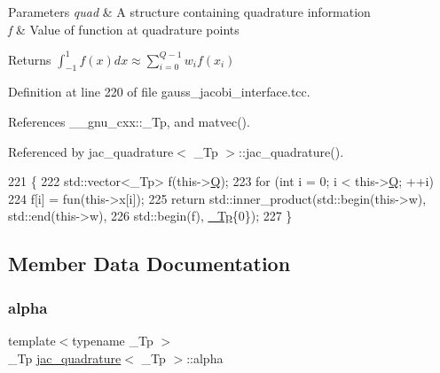 \begin{DoxyParams}{Parameters}
{\em quad} & A structure containing quadrature information \\
\hline
{\em f} & Value of function at quadrature points \\
\hline
\end{DoxyParams}
\begin{DoxyReturn}{Returns}
$\int_{-1}^{1} f(x) dx \approx \sum_{i=0}^{Q-1} w_i f(x_i)$ 
\end{DoxyReturn}


Definition at line 220 of file gauss\+\_\+jacobi\+\_\+interface.\+tcc.



References \+\_\+\+\_\+gnu\+\_\+cxx\+::\+\_\+\+Tp, and matvec().



Referenced by jac\+\_\+quadrature$<$ \+\_\+\+Tp $>$\+::jac\+\_\+quadrature().


\begin{DoxyCode}
221     \{
222       std::vector<\_Tp> f(this->\hyperlink{structjac__quadrature_a91ae5ef05b9ea80951e40cc8a794c834}{Q});
223       \textcolor{keywordflow}{for} (\textcolor{keywordtype}{int} i = 0; i < this->\hyperlink{structjac__quadrature_a91ae5ef05b9ea80951e40cc8a794c834}{Q}; ++i)
224         f[i] = fun(this->x[i]);
225       \textcolor{keywordflow}{return} std::inner\_product(std::begin(this->w), std::end(this->w),
226                                 std::begin(f), \hyperlink{namespace____gnu__cxx_a3b19a9c800ca194374ef9172290f7d79}{\_Tp}\{0\});
227     \}
\end{DoxyCode}


\subsection{Member Data Documentation}
\mbox{\label{structjac__quadrature_a24503b91f0dbdc3d3ab3bd802c990e68}} 
\subsubsection{\texorpdfstring{alpha}{alpha}}
{\footnotesize\ttfamily template$<$typename \+\_\+\+Tp $>$ \\
\+\_\+\+Tp \hyperlink{structjac__quadrature}{jac\+\_\+quadrature}$<$ \+\_\+\+Tp $>$\+::alpha}



